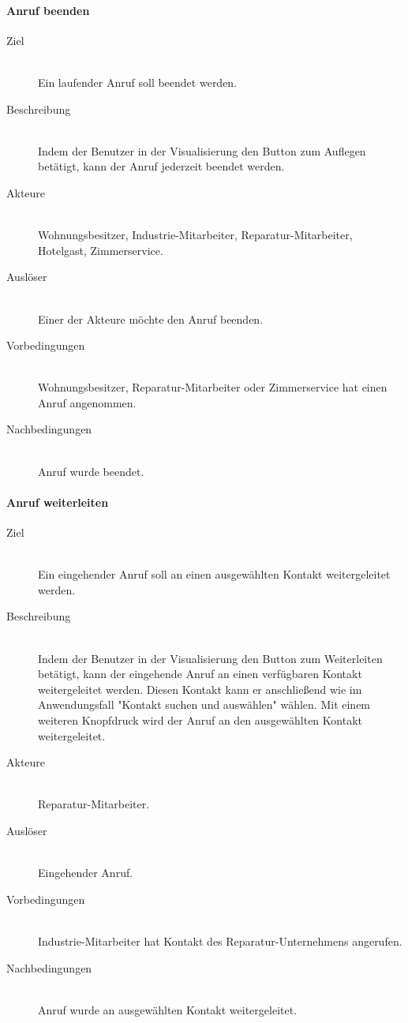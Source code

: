 \paragraph{Anruf beenden}
    \begin{description}
        \item[Ziel]\hfill \\
        Ein laufender Anruf soll beendet werden.
        \item[Beschreibung]\hfill \\
        Indem der Benutzer in der Visualisierung den Button zum Auflegen betätigt, kann der Anruf jederzeit beendet werden.
        \item[Akteure]\hfill \\
        Wohnungsbesitzer, Industrie-Mitarbeiter, Reparatur-Mitarbeiter, Hotelgast, Zimmerservice.
        \item[Auslöser]\hfill \\
        Einer der Akteure möchte den Anruf beenden.
        \item[Vorbedingungen]\hfill \\
        Wohnungsbesitzer, Reparatur-Mitarbeiter oder Zimmerservice hat einen Anruf angenommen.
        \item[Nachbedingungen]\hfill \\
        Anruf wurde beendet.
        \end{description}

\paragraph{Anruf weiterleiten}
    \begin{description}
        \item[Ziel]\hfill \\
        Ein eingehender Anruf soll an einen ausgewählten Kontakt weitergeleitet werden.
        \item[Beschreibung]\hfill \\
        Indem der Benutzer in der Visualisierung den Button zum Weiterleiten betätigt, kann der eingehende Anruf an einen verfügbaren Kontakt weitergeleitet werden.
        Diesen Kontakt kann er anschließend wie im Anwendungsfall "Kontakt suchen und auswählen" wählen.
        Mit einem weiteren Knopfdruck wird der Anruf an den ausgewählten Kontakt weitergeleitet.
        \item[Akteure]\hfill \\
        Reparatur-Mitarbeiter.
        \item[Auslöser]\hfill \\
        Eingehender Anruf.
        \item[Vorbedingungen]\hfill \\
        Industrie-Mitarbeiter hat Kontakt des Reparatur-Unternehmens angerufen.
        \item[Nachbedingungen]\hfill \\
        Anruf wurde an ausgewählten Kontakt weitergeleitet.
        \end{description}

